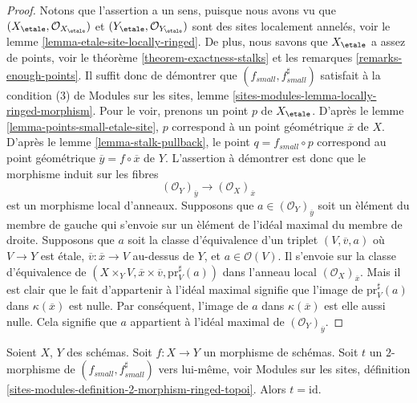 \begin{proof}
Notons que l'assertion a un sens, puisque nous avons vu que
$(X_\etale, \mathcal{O}_{X_\etale})$ et
$(Y_\etale, \mathcal{O}_{Y_\etale})$
sont des sites localement annel\'es, voir le
lemme \ref{lemma-etale-site-locally-ringed}.
De plus, nous savons que $X_\etale$ a assez de points, voir le
th\'eor\`eme \ref{theorem-exactness-stalks}
et les
remarques \ref{remarks-enough-points}.
Il suffit donc de d\'emontrer que $(f_{small}, f_{small}^\sharp)$
satisfait \`a la condition (3) de
Modules sur les sites,
lemme \ref{sites-modules-lemma-locally-ringed-morphism}.
Pour le voir, prenons un point $p$ de $X_\etale$. D'apr\`es le
lemme \ref{lemma-points-small-etale-site},
$p$ correspond \`a un point g\'eom\'etrique $\overline{x}$ de $X$.
D'apr\`es le
lemme \ref{lemma-stalk-pullback},
le point $q = f_{small} \circ p$ correspond au
point g\'eom\'etrique $\overline{y} = f \circ \overline{x}$ de $Y$.
L'assertion \`a d\'emontrer est donc que le morphisme induit
sur les fibres
$$
(\mathcal{O}_Y)_{\overline{y}} \longrightarrow (\mathcal{O}_X)_{\overline{x}}
$$
est un morphisme local d'anneaux. Supposons que $a \in (\mathcal{O}_Y)_{\overline{y}}$
soit un \`el\'ement du membre de gauche qui s'envoie sur un \`el\'ement de l'id\'eal
maximal du membre de droite. Supposons que $a$ soit la classe d'\'equivalence
d'un triplet $(V, \overline{v}, a)$ o\`u $V \to Y$ est \'etale,
$\overline{v} : \overline{x} \to V$ au-dessus de $Y$, et $a \in \mathcal{O}(V)$.
Il s'envoie sur la classe d'\'equivalence de
$(X \times_Y V, \overline{x} \times \overline{v}, \text{pr}_V^\sharp(a))$
dans l'anneau local $(\mathcal{O}_X)_{\overline{x}}$. Mais il est clair que
le fait d'appartenir \`a l'id\'eal maximal signifie que l'image de $\text{pr}_V^\sharp(a)$
dans $\kappa(\overline{x})$ est nulle. Par cons\'equent, l'image de
$a$ dans $\kappa(\overline{x})$ est elle aussi nulle. Cela signifie que $a$ appartient \`a
l'id\'eal maximal de $(\mathcal{O}_Y)_{\overline{y}}$.
\end{proof}

\begin{lemma}
\label{lemma-2-morphism}
Soient $X$, $Y$ des sch\'emas. Soit $f : X \to Y$ un morphisme de sch\'emas.
Soit $t$ un $2$-morphisme de $(f_{small}, f_{small}^\sharp)$ vers lui-m\^eme, voir
Modules sur les sites,
définition \ref{sites-modules-definition-2-morphism-ringed-topoi}.
Alors $t = \text{id}$.
\end{lemma}

